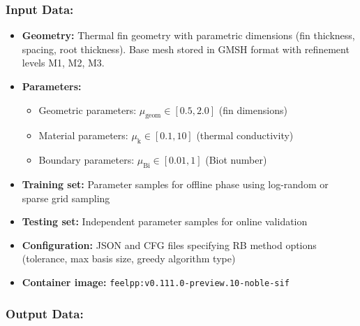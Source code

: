 \subsubsection{Input Data:}
\begin{itemize}
\item \textbf{Geometry:} Thermal fin geometry with parametric dimensions (fin thickness, spacing, root thickness). Base mesh stored in GMSH format with refinement levels M1, M2, M3.

\item \textbf{Parameters:} 
  \begin{itemize}
  \item Geometric parameters: $\mu_{\text{geom}} \in [0.5, 2.0]$ (fin dimensions)
  \item Material parameters: $\mu_{\text{k}} \in [0.1, 10]$ (thermal conductivity)
  \item Boundary parameters: $\mu_{\text{Bi}} \in [0.01, 1]$ (Biot number)
  \end{itemize}

\item \textbf{Training set:} Parameter samples for offline phase using log-random or sparse grid sampling

\item \textbf{Testing set:} Independent parameter samples for online validation

\item \textbf{Configuration:} JSON and CFG files specifying RB method options (tolerance, max basis size, greedy algorithm type)

\item \textbf{Container image:} \texttt{feelpp:v0.111.0-preview.10-noble-sif}
\end{itemize}

\subsubsection{Output Data:}

